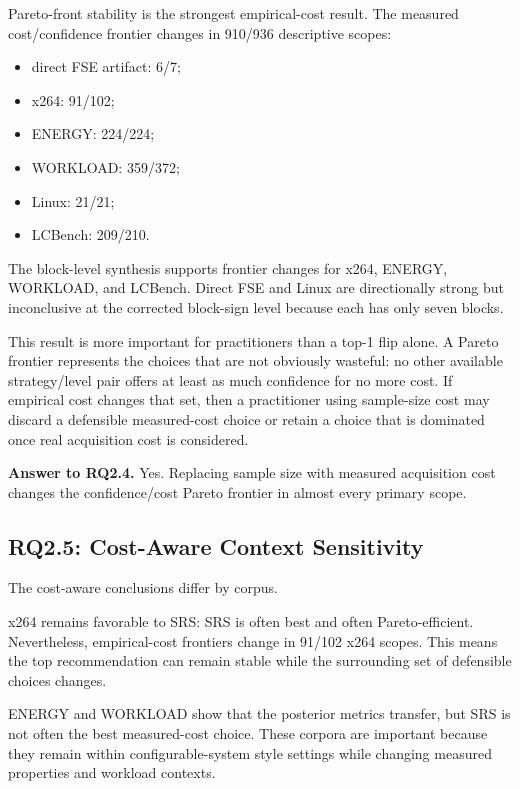 \documentclass[smallcondensed]{svjour3}
\providecommand{\tightlist}{%
  \setlength{\itemsep}{0pt}\setlength{\parskip}{0pt}}
\begin{document}
Pareto-front stability is the strongest empirical-cost result. The
measured cost/confidence frontier changes in 910/936 descriptive scopes:

\begin{itemize}
\tightlist
\item
  direct FSE artifact: 6/7;
\item
  x264: 91/102;
\item
  ENERGY: 224/224;
\item
  WORKLOAD: 359/372;
\item
  Linux: 21/21;
\item
  LCBench: 209/210.
\end{itemize}

The block-level synthesis supports frontier changes for x264, ENERGY,
WORKLOAD, and LCBench. Direct FSE and Linux are directionally strong but
inconclusive at the corrected block-sign level because each has only
seven blocks.

This result is more important for practitioners than a top-1 flip alone.
A Pareto frontier represents the choices that are not obviously
wasteful: no other available strategy/level pair offers at least as much
confidence for no more cost. If empirical cost changes that set, then a
practitioner using sample-size cost may discard a defensible
measured-cost choice or retain a choice that is dominated once real
acquisition cost is considered.

\textbf{Answer to RQ2.4.} Yes. Replacing sample size with measured
acquisition cost changes the confidence/cost Pareto frontier in almost
every primary scope.

\subsection{RQ2.5: Cost-Aware Context
Sensitivity}\label{rq2.5-cost-aware-context-sensitivity}

The cost-aware conclusions differ by corpus.

x264 remains favorable to SRS: SRS is often best and often
Pareto-efficient. Nevertheless, empirical-cost frontiers change in
91/102 x264 scopes. This means the top recommendation can remain stable
while the surrounding set of defensible choices changes.

ENERGY and WORKLOAD show that the posterior metrics transfer, but SRS is
not often the best measured-cost choice. These corpora are important
because they remain within configurable-system style settings while
changing measured properties and workload contexts.
\end{document}
